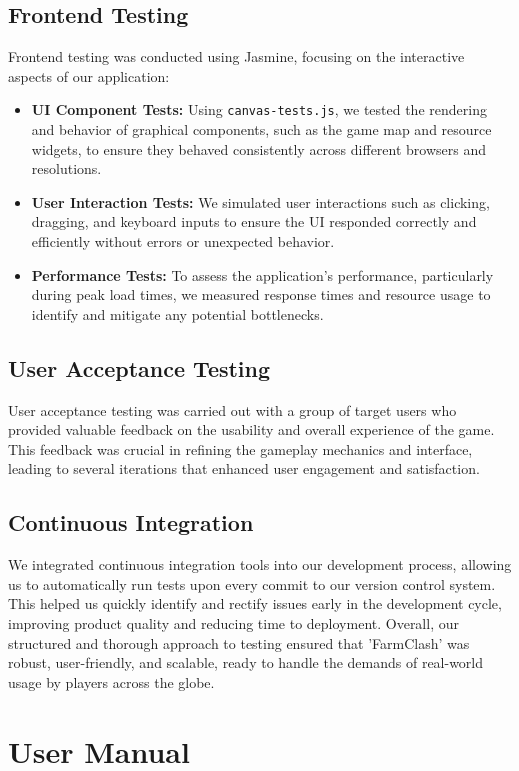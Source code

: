 \documentclass[12pt]{article}
\begin{document}
\subsection{Frontend Testing}
Frontend testing was conducted using Jasmine, focusing on the interactive aspects of our application:
\begin{itemize}
    \item \textbf{UI Component Tests:} Using \texttt{canvas-tests.js}, we tested the rendering and behavior of graphical components, such as the game map and resource widgets, to ensure they behaved consistently across different browsers and resolutions.
    \item \textbf{User Interaction Tests:} We simulated user interactions such as clicking, dragging, and keyboard inputs to ensure the UI responded correctly and efficiently without errors or unexpected behavior.
    \item \textbf{Performance Tests:} To assess the application’s performance, particularly during peak load times, we measured response times and resource usage to identify and mitigate any potential bottlenecks.
\end{itemize}
\subsection{User Acceptance Testing}
User acceptance testing was carried out with a group of target users who provided valuable feedback on the usability and overall experience of the game. This feedback was crucial in refining the gameplay mechanics and interface, leading to several iterations that enhanced user engagement and satisfaction.
\subsection{Continuous Integration}
We integrated continuous integration tools into our development process, allowing us to automatically run tests upon every commit to our version control system. This helped us quickly identify and rectify issues early in the development cycle, improving product quality and reducing time to deployment.
Overall, our structured and thorough approach to testing ensured that 'FarmClash' was robust, user-friendly, and scalable, ready to handle the demands of real-world usage by players across the globe.

\section{User Manual}
\end{document}
